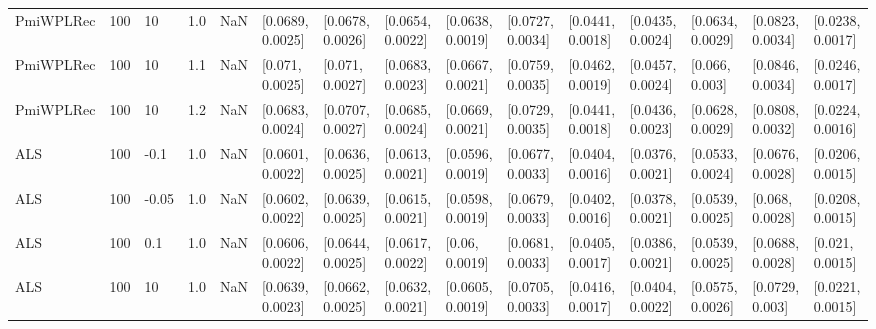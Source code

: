\begin{tabular}{lllrrllllllllll}
 PmiWPLRec &  100 &    10 &   1.0 &   NaN &  [0.0689, 0.0025] &  [0.0678, 0.0026] &  [0.0654, 0.0022] &  [0.0638, 0.0019] &  [0.0727, 0.0034] &  [0.0441, 0.0018] &  [0.0435, 0.0024] &  [0.0634, 0.0029] &  [0.0823, 0.0034] &  [0.0238, 0.0017] \\
 PmiWPLRec &  100 &    10 &   1.1 &   NaN &   [0.071, 0.0025] &   [0.071, 0.0027] &  [0.0683, 0.0023] &  [0.0667, 0.0021] &  [0.0759, 0.0035] &  [0.0462, 0.0019] &  [0.0457, 0.0024] &    [0.066, 0.003] &  [0.0846, 0.0034] &  [0.0246, 0.0017] \\
 PmiWPLRec &  100 &    10 &   1.2 &   NaN &  [0.0683, 0.0024] &  [0.0707, 0.0027] &  [0.0685, 0.0024] &  [0.0669, 0.0021] &  [0.0729, 0.0035] &  [0.0441, 0.0018] &  [0.0436, 0.0023] &  [0.0628, 0.0029] &  [0.0808, 0.0032] &  [0.0224, 0.0016] \\
       ALS &  100 &  -0.1 &   1.0 &   NaN &  [0.0601, 0.0022] &  [0.0636, 0.0025] &  [0.0613, 0.0021] &  [0.0596, 0.0019] &  [0.0677, 0.0033] &  [0.0404, 0.0016] &  [0.0376, 0.0021] &  [0.0533, 0.0024] &  [0.0676, 0.0028] &  [0.0206, 0.0015] \\
       ALS &  100 & -0.05 &   1.0 &   NaN &  [0.0602, 0.0022] &  [0.0639, 0.0025] &  [0.0615, 0.0021] &  [0.0598, 0.0019] &  [0.0679, 0.0033] &  [0.0402, 0.0016] &  [0.0378, 0.0021] &  [0.0539, 0.0025] &   [0.068, 0.0028] &  [0.0208, 0.0015] \\
       ALS &  100 &   0.1 &   1.0 &   NaN &  [0.0606, 0.0022] &  [0.0644, 0.0025] &  [0.0617, 0.0022] &    [0.06, 0.0019] &  [0.0681, 0.0033] &  [0.0405, 0.0017] &  [0.0386, 0.0021] &  [0.0539, 0.0025] &  [0.0688, 0.0028] &   [0.021, 0.0015] \\
       ALS &  100 &    10 &   1.0 &   NaN &  [0.0639, 0.0023] &  [0.0662, 0.0025] &  [0.0632, 0.0021] &  [0.0605, 0.0019] &  [0.0705, 0.0033] &  [0.0416, 0.0017] &  [0.0404, 0.0022] &  [0.0575, 0.0026] &   [0.0729, 0.003] &  [0.0221, 0.0015] \\
\bottomrule
\end{tabular}

